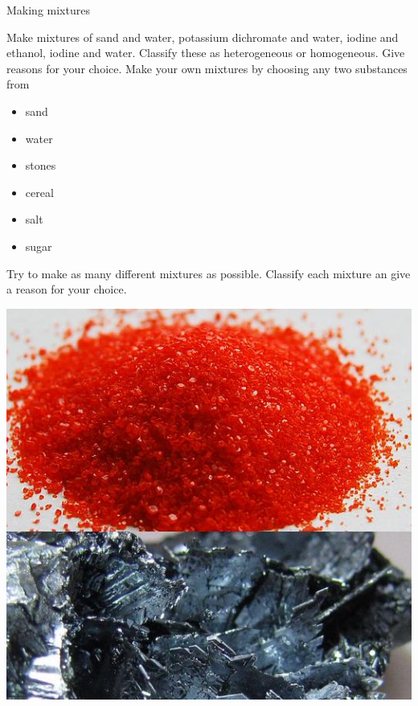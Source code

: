 \vspace{-1cm}
\begin{activity}{Making mixtures}
{
\begin{minipage}{0.6\textwidth}
Make mixtures of sand and water, potassium dichromate and water, iodine and ethanol, iodine and water. Classify these as heterogeneous or homogeneous. Give reasons for your choice. Make your own mixtures by choosing any two substances from \begin{itemize}[noitemsep] \item sand \item water \item stones \item cereal \item salt \item sugar \end{itemize} Try to make as many different mixtures as possible. Classify each mixture an give a reason for your choice.
                                                                                                                                                                                                                                                                                                                                                                                                                      
\end{minipage}
\begin{minipage}{.4\textwidth}
{
\begin{center}
 \includegraphics[width=.7\textwidth]{photos/iodine-KCr2O7-wikipedia.jpg}\par
\end{center}
}

\end{minipage}
}
\end{activity}
